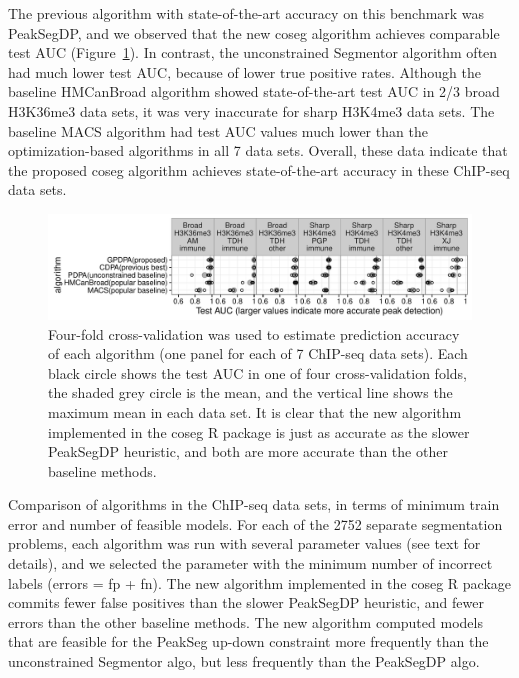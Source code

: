 \documentclass{article}
\begin{document}
The previous algorithm with state-of-the-art accuracy on this
benchmark was PeakSegDP, and we observed that the new coseg algorithm
achieves comparable test AUC (Figure~\ref{fig:test-error-dots}). In
contrast, the unconstrained Segmentor algorithm often had much lower
test AUC, because of lower true positive rates. Although the baseline
HMCanBroad algorithm showed state-of-the-art test AUC in 2/3 broad
H3K36me3 data sets, it was very inaccurate for sharp H3K4me3 data
sets. The baseline MACS algorithm had test AUC values much lower than
the optimization-based algorithms in all 7 data sets. Overall, these
data indicate that the proposed coseg algorithm achieves
state-of-the-art accuracy in these ChIP-seq data sets.

\begin{figure}[b!]
  \centering
  \includegraphics[width=\textwidth]{figure-test-error-dots}
  \vskip -0.5cm
  \caption{Four-fold cross-validation was used to estimate prediction
    accuracy of each algorithm (one panel for each of 7 ChIP-seq data sets). 
Each black circle shows the test AUC in one of four
    cross-validation folds, the shaded grey circle is the mean, and
    the vertical line shows the maximum mean in each data set. It is
    clear that the new algorithm implemented in the coseg R package is
    just as accurate as the slower PeakSegDP heuristic, and both are
    more accurate than the other baseline methods. 
  }
  \label{fig:test-error-dots}
\end{figure}

\begin{table}[b!]
  \centering
  
  \caption{Comparison of algorithms in the ChIP-seq data sets,
    in terms of minimum train error and number of feasible models. 
    For each of the 2752 separate segmentation problems, 
    each algorithm was run with several parameter values (see text for details), 
    and we selected the parameter with the minimum number of incorrect labels
    (errors = fp + fn). 
    The new algorithm implemented in the coseg R package 
    commits fewer false positives than the slower PeakSegDP heuristic, 
    and fewer errors than the other baseline methods.
    The new algorithm computed models that are feasible for the PeakSeg up-down constraint
    more frequently than the unconstrained Segmentor algo,
    but less frequently than the PeakSegDP algo.}
  \label{tab:min-train-error}
\end{table}
\end{document}
